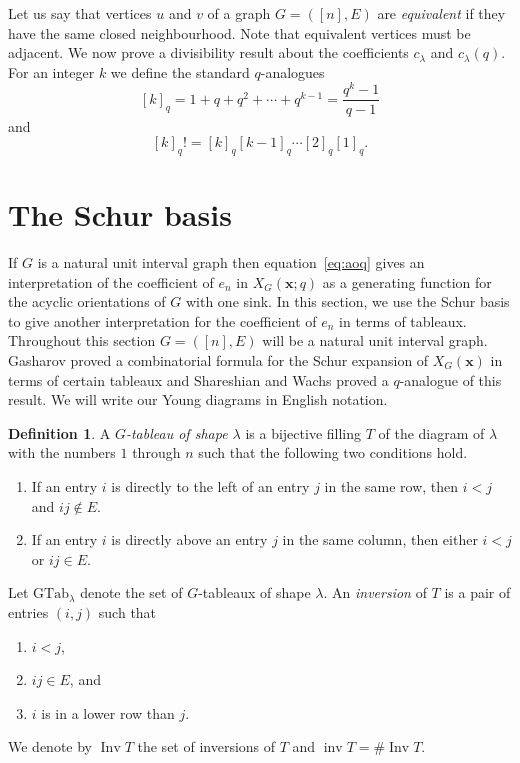 \documentclass[10pt,a4paper]{amsart}
\theoremstyle{definition}
\newtheorem{definition}[theorem]{Definition}
\theoremstyle{remark}
\numberwithin{equation}{section}
\DeclareMathOperator{\Inv}{Inv}
\DeclareMathOperator{\inv}{inv}
\begin{document}
Let us say that vertices $u$ and $v$ of a graph $G=([n],E)$ are \emph{equivalent} if they have the same closed neighbourhood. Note that equivalent vertices must be adjacent. We now prove a divisibility result about the coefficients $c_\lambda$ and $c_\lambda(q)$. For an integer $k$ we define the standard $q$-analogues
$$
[k]_q=1+q+q^2+\cdots+q^{k-1}=\frac{q^k-1}{q-1}
$$
and 
$$
[k]_q!=[k]_q[k-1]_q\cdots[2]_q[1]_q.
$$

\setcounter{figure}{3}

\section{The Schur basis}\label{sec:Schur}

If $G$ is a natural unit interval graph then equation~\eqref{eq:aoq} gives an interpretation of the coefficient of $e_n$ in $X_G(\bm x;q)$ as a generating function for the acyclic orientations of $G$ with one sink.
In this section, we use the Schur basis to give another interpretation for the coefficient of $e_n$ in terms of tableaux. 
Throughout this section $G=([n],E)$ will be a natural unit interval graph. Gasharov \cite[Theorem 4]{chrompos31} proved a combinatorial formula for the Schur expansion of $X_G(\bm x)$ in terms of certain tableaux and Shareshian and Wachs \cite[Theorem 6.3]{chromposquasi} proved a $q$-analogue of this result. We will write our Young diagrams in English notation.

\begin{definition}
A \emph{$G$-tableau of shape $\lambda$} is a bijective filling $T$ of the diagram of $\lambda$ with the numbers $1$ through $n$ such that the following two conditions hold.
\begin{enumerate}
\item[(C1)] If an entry $i$ is directly to the left of an entry $j$ in the same row, then $i<j$ and $ij\notin E$.
\item[(C2)] If an entry $i$ is directly above an entry $j$ in the same column, then either $i<j$ or $ij\in E$.
\end{enumerate}
Let $\text{GTab}_\lambda$ denote the set of $G$-tableaux of shape $\lambda$. An \emph{inversion} of $T$ is a pair of entries $(i,j)$ such that
\begin{enumerate}
    \item[(I1)] $i<j$,
    \item[(I2)] $ij\in E$, and
    \item[(I3)] $i$ is in a lower row than $j$.    
\end{enumerate}
We denote by $\Inv T$ the set of inversions of $T$ and $\inv T=\#\Inv T$.
\end{definition}
\end{document}
